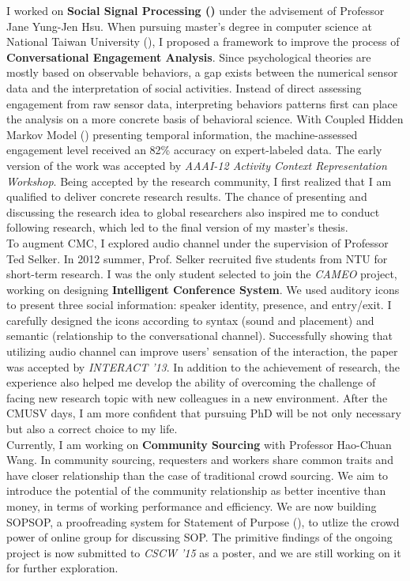 \noindent 
I worked on \textbf{Social Signal Processing ()} under the advisement of Professor Jane Yung-Jen Hsu. 
When pursuing master's degree in computer science at National Taiwan University (), 
I proposed a framework to improve the process of \textbf{Conversational Engagement Analysis}. 
Since psychological theories are mostly based on observable behaviors, 
a gap exists between the numerical sensor data and the interpretation of social activities.
Instead of direct assessing engagement from raw sensor data,
interpreting behaviors patterns first can place the analysis on a more concrete basis of behavioral science. 
With Coupled Hidden Markov Model () presenting temporal information, 
the machine-assessed engagement level received an 82\% accuracy on expert-labeled data. 
The early version of the work was accepted by \textit{AAAI-12 Activity Context Representation Workshop}. 
Being accepted by the research community, I first realized that I am qualified to deliver concrete research results. 
The chance of presenting and discussing the research idea to global researchers also inspired me to conduct following research, 
which led to the final version of my master’s thesis.\\

\noindent 
To augment CMC, I explored audio channel under the supervision of Professor Ted Selker. 
In 2012 summer, Prof. Selker recruited five students from NTU for short-term research.
I was the only student selected to join the \textit{CAMEO} project, working on designing \textbf{Intelligent Conference System}. 
We used auditory icons to present three social information: speaker identity, presence, and entry/exit. 
I carefully designed the icons according to syntax (sound and placement) and semantic (relationship to the conversational channel). 
Successfully showing that utilizing audio channel can improve users' sensation of the interaction, the paper was accepted by \textit{INTERACT '13}. 
In addition to the achievement of research, 
the experience also helped me develop the ability of overcoming the challenge of facing new research topic with new colleagues in a new environment. 
After the CMUSV days, I am more confident that pursuing PhD will be not only necessary but also a correct choice to my life.\\

\noindent
Currently, I am working on \textbf{Community Sourcing} with Professor Hao-Chuan Wang.
In community sourcing, 
requesters and workers share common traits and have closer relationship than the case of traditional crowd sourcing.
We aim to introduce the potential of the community relationship as better incentive than money,
in terms of working performance and efficiency.
We are now building SOPSOP, a proofreading system for Statement of Purpose (), 
to utlize the crowd power of online group for discussing SOP.
The primitive findings of the ongoing project is now submitted to \textit{CSCW '15} as a poster,
and we are still working on it for further exploration. \\




